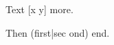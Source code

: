 \documentclass{article}
\newcommand\foo[1]{[#1]}
\newcommand\two[2]{(#1|#2)}
\begin{document}
Text \foo{x \undefinedA y} more.

Then \two{first}{sec \undefinedB ond} end.
\end{document}
